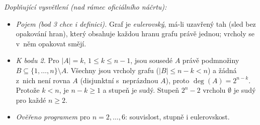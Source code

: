 \medskip
\noindent\textit{Doplňující vysvětlení (nad rámec oficiálního náčrtu):}
\begin{itemize}
  \item \emph{Pojem (bod 3 chce i definici).} Graf je \emph{eulerovský}, má-li uzavřený tah (sled bez opakování hran), který obsahuje každou hranu grafu právě jednou; vrcholy se v~něm opakovat smějí.
  \item \emph{K bodu 2.} Pro $|A|=k$, $1\leq k\leq n-1$, jsou sousedé $A$ právě podmnožiny $B\subseteq\{1,\dots,n\}\setminus A$. Všechny jsou vrcholy grafu ($|B|\leq n-k<n$) a žádná z~nich není rovna $A$ (disjunktní s~neprázdnou $A$), proto $\deg(A)=2^{n-k}$. Protože $k<n$, je $n-k\geq 1$ a stupeň je sudý. Stupeň $2^n-2$ vrcholu $\emptyset$ je sudý pro každé $n\geq 2$.
  \item \emph{Ověřeno programem} pro $n=2,\dots,6$: souvislost, stupně i eulerovskost.
\end{itemize}
